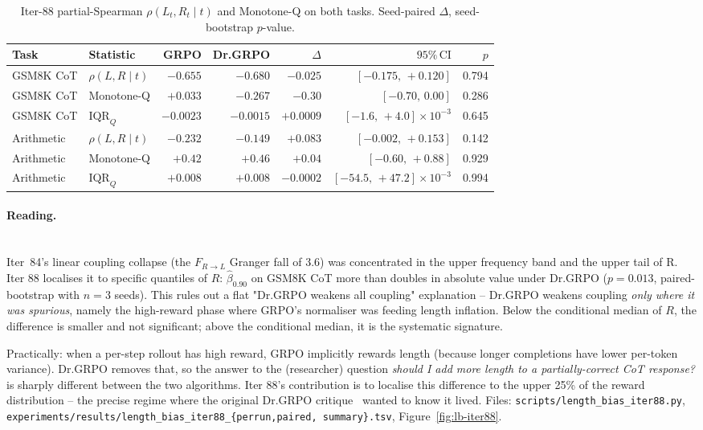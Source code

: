\begin{table}[t]
\centering\small
\caption{Iter-88 partial-Spearman $\rho(L_t,R_t\mid t)$ and Monotone-Q
on both tasks.  Seed-paired $\Delta$, seed-bootstrap $p$-value.}\label{tab:lb-iter88-partial}
\begin{tabular}{llrrrrr}\hline
Task & Statistic & GRPO & Dr.GRPO & $\Delta$ & $95\%\,\mathrm{CI}$ & $p$\\\hline
GSM8K CoT        & $\rho(L,R\mid t)$   & $-0.655$ & $-0.680$ & $-0.025$ & $[-0.175,\,+0.120]$ & 0.794\\
GSM8K CoT        & Monotone-Q           & $+0.033$ & $-0.267$ & $-0.30$  & $[-0.70,\,0.00]$     & 0.286\\
GSM8K CoT        & $\mathrm{IQR}_Q$     & $-0.0023$ & $-0.0015$ & $+0.0009$ & $[-1.6,\,+4.0]\!\times\!10^{-3}$ & 0.645\\
Arithmetic & $\rho(L,R\mid t)$   & $-0.232$ & $-0.149$ & $+0.083$ & $[-0.002,\,+0.153]$  & 0.142\\
Arithmetic & Monotone-Q           & $+0.42$  & $+0.46$  & $+0.04$  & $[-0.60,\,+0.88]$    & 0.929\\
Arithmetic & $\mathrm{IQR}_Q$     & $+0.008$ & $+0.008$ & $-0.0002$ & $[-54.5,\,+47.2]\!\times\!10^{-3}$ & 0.994\\\hline
\end{tabular}
\end{table}

\paragraph{Reading.}\leavevmode\\[-0.3em]
Iter~84's linear coupling collapse (the $F_{R\to L}$ Granger fall of
3.6) was concentrated in the upper frequency band and the upper tail
of R.  Iter 88 localises it to specific quantiles of $R$: $\hat\beta_{0.90}$
on GSM8K CoT more than doubles in absolute value under Dr.GRPO
($p\!=\!0.013$, paired-bootstrap with $n\!=\!3$ seeds).  This rules out a
flat "Dr.GRPO weakens all coupling" explanation -- Dr.GRPO weakens
coupling \emph{only where it was spurious}, namely the high-reward
phase where GRPO's normaliser was feeding length inflation.  Below the
conditional median of $R$, the difference is smaller and not
significant; above the conditional median, it is the systematic
signature.

Practically: when a per-step rollout has high reward, GRPO implicitly
rewards length (because longer completions have lower per-token
variance).  Dr.GRPO removes that, so the answer to the (researcher)
question \emph{should I add more length to a partially-correct
CoT response?} is sharply different between the two algorithms.  Iter 88's
contribution is to localise this difference to the upper 25\% of the
reward distribution -- the precise regime where the original
Dr.GRPO critique~\citep{tong2025drgrpo} wanted to know it lived.
Files: \texttt{scripts/length\_bias\_iter88.py},
\texttt{experiments/results/length\_bias\_iter88\_\{perrun,paired,
summary\}.tsv},
Figure~\ref{fig:lb-iter88}.

